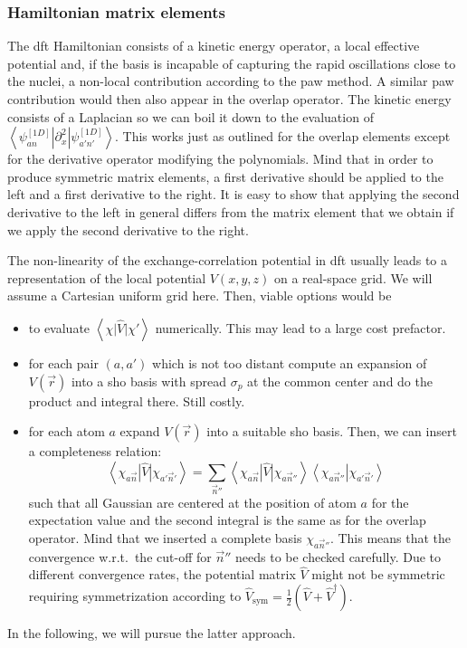 \documentclass[oribibl]{llncs}
\newcommand{\um}[1]{_{\mathrm{#1}}}
\newcommand{\braket}[2]{\left\langle \left. #1 \right| #2 \right\rangle}
\newcommand{\braketop}[3]{\left\langle \left. #1 \right| #2 \left| #3 \right. \right\rangle}
\begin{document}
\subsubsection{Hamiltonian matrix elements}
The \ac{dft} Hamiltonian consists of a kinetic energy operator,
a local effective potential 
and, if the basis is incapable of
capturing the rapid oscillations close to the nuclei,
a non-local contribution according to the \ac{paw} method.
A similar \ac{paw} contribution would then also appear in the overlap operator.
The kinetic energy consists of a Laplacian so we can boil it down to the evaluation
of $\braketop{ \psi^{[1D]}_{an} }{ \partial^2_x }{ \psi^{[1D]}_{a'n'} }$.
This works just as outlined for the overlap elements
except for the derivative operator modifying the polynomials.
Mind that in order to produce symmetric matrix elements,
a first derivative should be applied to the left and a first derivative to the right.
It is easy to show that applying the second derivative to the left in general differs from
the matrix element that we obtain if we apply the second derivative to the right.

The non-linearity of the exchange-correlation potential in \ac{dft} usually
leads to a representation of the local potential $V(x,y,z)$ on a real-space grid.
We will assume a Cartesian uniform grid here.
Then, viable options would be
\begin{itemize}
%
\item to evaluate $\braketop{ \chi }{ \hat V }{ \chi' }$ numerically. This may lead to a large cost prefactor.
%
\item for each pair $(a,a')$ which is not too distant
compute an expansion of $V(\vec r)$ into a \ac{sho} basis with spread $\sigma_p$
at the common center and do the product and integral there. Still costly.
%
\item for each atom $a$ expand $V(\vec r)$ into a suitable \ac{sho} basis. 
Then, we can insert a completeness relation:
\begin{equation}
 \braketop{ \chi_{a\vec n} }{ \hat V }{ \chi_{a'\vec n'} } = \sum_{\vec n''}
 \braketop{ \chi_{a\vec n} }{ \hat V }{ \chi_{a\vec n''} } \braket{ \chi_{a\vec n''} }{ \chi_{a'\vec n'} }
\end{equation}
such that all Gaussian are centered at the position of atom $a$ for the expectation value
and the second integral is the same as for the overlap operator.
Mind that we inserted a complete basis $\chi_{a\vec n''}$. 
This means that the convergence w.r.t.~the cut-off for $\vec n''$ needs to be checked carefully.
Due to different convergence rates, the potential matrix $\hat V$ might not be symmetric
requiring symmetrization according to $\hat V\um{sym} = \frac 12 \left( \hat V + \hat V^\dagger \right)$.
%
\end{itemize}
In the following, we will pursue the latter approach.
\end{document}
